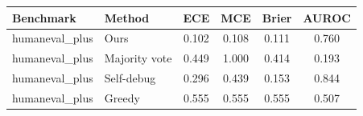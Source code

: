 \begin{tabular}{llcccc}
\toprule
Benchmark & Method & ECE & MCE & Brier & AUROC \\
\midrule
humaneval_plus & Ours & 0.102 & 0.108 & 0.111 & 0.760 \\
humaneval_plus & Majority vote & 0.449 & 1.000 & 0.414 & 0.193 \\
humaneval_plus & Self-debug & 0.296 & 0.439 & 0.153 & 0.844 \\
humaneval_plus & Greedy & 0.555 & 0.555 & 0.555 & 0.507 \\
\bottomrule
\end{tabular}
